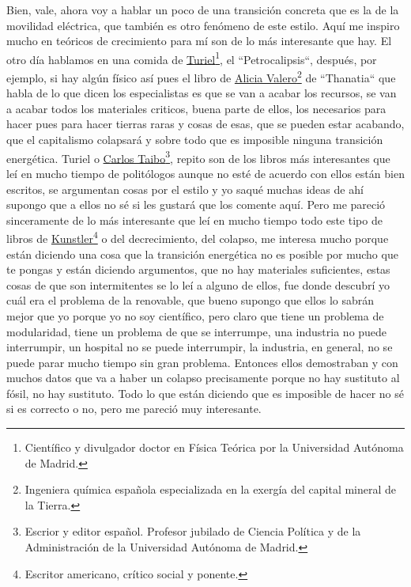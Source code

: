 Bien, vale, ahora voy a hablar un poco de una transición concreta que es la de la movilidad eléctrica, que también es otro fenómeno de este estilo. Aquí me inspiro mucho en teóricos de crecimiento para mí son de lo más interesante que hay.  El otro día hablamos en una comida de \href{https://es.wikipedia.org/wiki/Antonio_Turiel_Mart%C3%ADnez}{Turiel}\footnote{Científico y divulgador doctor en Física Teórica por la Universidad Autónoma de Madrid.}, el ``Petrocalipsis``\cite{martínez2020petrocalipsis}, después, por ejemplo, si hay algún físico así pues el libro de \href{https://es.wikipedia.org/wiki/Alicia_Valero_Delgado}{Alicia Valero}\footnote{Ingeniera química española especializada en la exergía del capital mineral de la Tierra.} de ``Thanatia``\cite{capilla2014thanatia} que habla de lo que dicen los especialistas es que se van a acabar los recursos, se van a acabar todos los materiales criticos, buena parte de ellos, los necesarios para hacer pues para hacer tierras raras y cosas de esas, que se pueden estar acabando, que el capitalismo colapsará y sobre todo que es imposible ninguna transición energética. Turiel o \href{https://en.wikipedia.org/wiki/Carlos_Taibo}{Carlos Taibo}\footnote{Escrior y editor español. Profesor jubilado de Ciencia Política y de la Administración de la Universidad Autónoma de Madrid.}, repito son de los libros más interesantes que leí en mucho tiempo de politólogos aunque no esté de acuerdo con ellos están bien escritos, se argumentan cosas por el estilo y yo saqué muchas ideas de ahí supongo que a ellos no sé si les gustará que los comente aquí. Pero me pareció sinceramente de lo más interesante que leí en mucho tiempo todo este tipo de libros de \href{https://en.wikipedia.org/wiki/James_Howard_Kunstler}{Kunstler}\footnote{Escritor americano, crítico social y ponente.} o del decrecimiento, del colapso, me interesa mucho porque están diciendo una cosa que la transición energética no es posible por mucho que te pongas y están diciendo argumentos, que no hay materiales suficientes, estas cosas de que son intermitentes se lo leí a alguno de ellos, fue donde descubrí yo cuál era el problema de la renovable, que bueno supongo que ellos lo sabrán mejor que yo porque yo no soy científico, pero claro que tiene un problema de modularidad, tiene un problema de que se interrumpe, una industria no puede interrumpir, un hospital no se puede interrumpir, la industria, en general, no se puede parar mucho tiempo sin gran problema. Entonces ellos demostraban y con muchos datos que va a haber un colapso precisamente porque no hay sustituto al fósil, no hay sustituto. Todo lo que están diciendo que es imposible de hacer no sé si es correcto o no, pero me pareció muy interesante.

